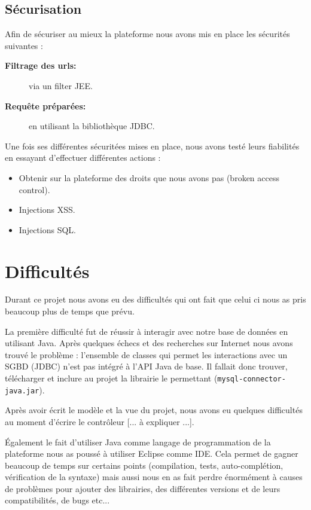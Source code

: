 \section{Sécurisation}

Afin de sécuriser au mieux la plateforme nous avons mis en place les sécurités suivantes :
\begin{description}
    \item[\textbf{Filtrage des urls:}] via un filter JEE.
    \item[\textbf{Requête préparées:}] en utilisant la bibliothèque JDBC.
\end{description}
\medskip

Une fois ses différentes sécuritées mises en place, nous avons testé leurs fiabilités en essayant
d'effectuer différentes actions :
\begin{itemize}
    \item Obtenir sur la plateforme des droits que nous avons pas (broken access control).
    \item Injections XSS.
    \item Injections SQL.
\end{itemize}

\chapter{Difficultés}

Durant ce projet nous avons eu des difficultés qui ont fait que celui ci nous as pris beaucoup
plus de temps que prévu.\newline

La première difficulté fut de réussir à interagir avec notre base de données en utilisant Java.
Après quelques échecs et des recherches sur Internet nous avons trouvé le problème : l'ensemble
de classes qui permet les interactions avec un SGBD (JDBC) n'est pas intégré à l'API Java de
base. Il fallait donc trouver, télécharger et inclure au projet la librairie le permettant
(\verb:mysql-connector-java.jar:).\newline

Après avoir écrit le modèle et la vue du projet, nous avons eu quelques difficultés au moment
d'écrire le contrôleur [... à expliquer ...].\newline

Également le fait d'utiliser Java comme langage de programmation de la plateforme nous as
poussé à utiliser Eclipse comme IDE. Cela permet de gagner beaucoup de temps sur certains points
(compilation, tests, auto-complétion, vérification de la syntaxe) mais aussi nous en as fait
perdre énormément à causes de problèmes pour ajouter des librairies, des différentes versions
et de leurs compatibilités, de bugs etc...

